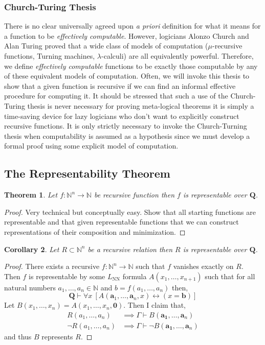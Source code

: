 \documentclass[12pt, leqno]{article}
\newcommand{\N}{\mathbb{N}}
\renewcommand{\bf}[1]{\mathbf{#1}}
\newcommand{\proves}{\vdash}
\newcommand{\uq}[1]{\forall{#1} \:}
\theoremstyle{theorem}
\newtheorem{theorem}{Theorem}[section]
\newtheorem{corollary}[theorem]{Corollary}
\theoremstyle{definition}
\theoremstyle{definition}
\theoremstyle{remark}
\theoremstyle{definition}
\theoremstyle{remark}
\begin{document}
\subsubsection{Church-Turing Thesis}

There is no clear universally agreed upon \textit{a priori} definition for what it means for a function to be \textit{effectively computable}. However, logicians Alonzo Church and Alan Turing proved that a wide class of models of computation ($\mu$-recursive functions, Turning machines, $\lambda$-calculi) are all equivalently powerful. Therefore, we define \textit{effectively computable} functions to be exactly those computable by any of these equivalent models of computation. Often, we will invoke this thesis to show that a given function is recursive if we can find an informal effective procedure for computing it. It should be stressed that such a use of the Church-Turing thesis is never necessary for proving meta-logical theorems it is simply a time-saving device for lazy logicians who don't want to explicitly construct recursive functions. It is only strictly necessary to invoke the Church-Turning thesis when computability is assumed as a hypothesis since we must develop a formal proof using some explicit model of computation. 
  
\subsection{The Representability Theorem}

\begin{theorem}
Let $f : \N^n \to \N$ be recursive function then $f$ is representable over $\bf{Q}$. 
\end{theorem}

\begin{proof}
Very technical but conceptually easy. Show that all starting functions are representable and that given representable functions that we can construct representations of their composition and minimization. 
\end{proof}

\begin{corollary}
Let $R \subset \N^n$ be a recursive relation then $R$ is representable over $\bf{Q}$.
\end{corollary}

\begin{proof}
There exists a recursive $f : \N^n \to \N$ such that $f$ vanishes exactly on $R$. Then $f$ is representable by some $L_{\text{NN}}$ formula $A(x_1, \dots, x_{n+1})$ such that for all natural numbers $a_1, \dots, a_n \in \N$ and $b = f(a_1, \dots, a_n)$ then,
\[ \bf{Q} \proves \uq{x} [ A(\bf{a}_1, \dots, \bf{a}_n, x) \leftrightarrow (x = \bf{b}) ] \] 
Let $B(x_1, \dots, x_n) = A(x_1, \dots, x_n, \bf{0})$. Then I claim that,
\begin{align*}
R(a_1, \dots, a_n) & \implies \Gamma \proves B(\bf{a_1}, \dots, \bf{a}_n)
\\
\neg R(a_1, \dots, a_n) & \implies \Gamma \proves \neg B(\bf{a_1}, \dots, \bf{a}_n)
\end{align*}
and thus $B$ represents $R$. 
\end{proof}
\end{document}
